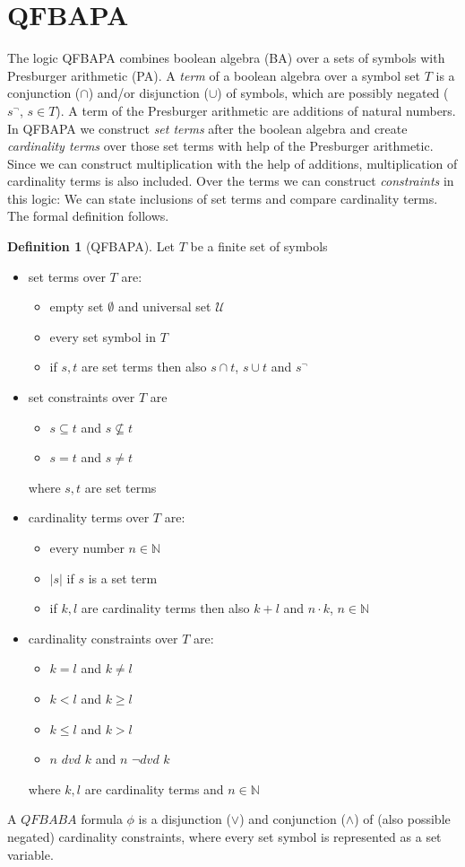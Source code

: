 \documentclass{book}
\theoremstyle{break}
\theoremstyle{definition}
\newtheorem{mydef}{Definition}
\begin{document}
\section{QFBAPA}
The logic QFBAPA \cite{KuncakRinard} combines boolean algebra (BA) over a sets of symbols with Presburger arithmetic (PA). A \textit{term} of a boolean algebra over a symbol set $T$ is a conjunction ($\cap$) and/or disjunction ($\cup$) of symbols, which are possibly negated ($s^\neg$, $s\in T$). A term of the Presburger arithmetic are additions of natural numbers. In QFBAPA we construct \textit{set terms} after the boolean algebra and create \textit{cardinality terms} over those set terms with help of the Presburger arithmetic. Since we can construct multiplication with the help of additions, multiplication of cardinality terms is also included. Over the terms we can construct \textit{constraints} in this logic: We can state inclusions of set terms and compare cardinality terms. The formal definition follows.
\begin{mydef}[QFBAPA]
Let $T$ be a finite set of symbols
\begin{itemize}
\item set terms over $T$ are:
\begin{itemize}
\item empty set $\emptyset$ and universal set $
\mathcal{U}$
\item every set symbol in $T$
\item if $s,t$ are set terms then also $s\cap t$, $s\cup t$ and $s^{\neg}$
\end{itemize}
\item set constraints over $T$ are
\begin{itemize}
\item $s\subseteq t$ and $s\not\subseteq t$
\item $s=t$ and $s\neq t$
\end{itemize}
where $s,t$ are set terms
\item cardinality terms over $T$ are:
\begin{itemize}
\item every number $n\in \mathbb{N}$
\item $|s|$ if $s$ is a set term
\item if $k,l$ are cardinality terms then also $k+l$ and $n\cdot k$, $n\in \mathbb{N}$
\end{itemize}
\item cardinality constraints over $T$ are:
\begin{itemize}
\item $k=l$ and $k\neq l$
\item $k<l$ and $k\geq l$
\item $k\leq l$ and $k>l$
\item $n$ $dvd$ $k$ and $n$ $\neg dvd$ $k$
\end{itemize}
where $k,l$ are cardinality terms and $n\in\mathbb{N}$
\end{itemize}
A $QFBABA$ formula $\phi$ is a disjunction ($\vee$) and conjunction ($\wedge$) of (also possible negated) cardinality constraints, where every set symbol is represented as a set variable.
\end{mydef}
\end{document}
